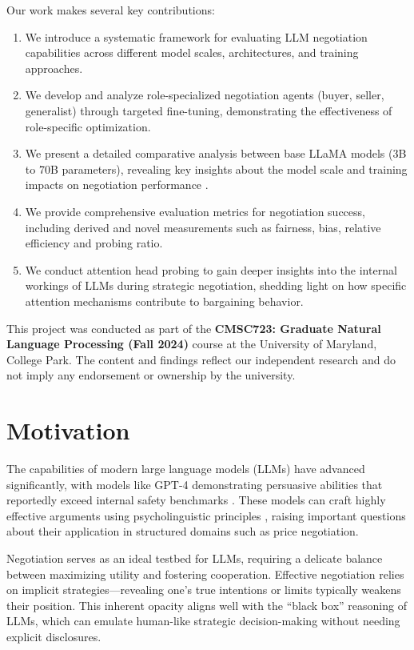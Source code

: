 \documentclass[11pt]{article}
\begin{document}
Our work makes several key contributions:
\begin{enumerate}
    \item We introduce a systematic framework for evaluating LLM negotiation capabilities across different model scales, architectures, and training approaches.
    \item We develop and analyze role-specialized negotiation agents (buyer, seller, generalist) through targeted fine-tuning, demonstrating the effectiveness of role-specific optimization.
    \item We present a detailed comparative analysis between base LLaMA models (3B to 70B parameters), revealing key insights about the model scale and training impacts on negotiation performance \citep{touvron2023llamaopenefficientfoundation}.
    \item We provide comprehensive evaluation metrics for negotiation success, including derived and novel measurements such as fairness, bias, relative efficiency and probing ratio.
    \item We conduct attention head probing to gain deeper insights into the internal workings of LLMs during strategic negotiation, shedding light on how specific attention mechanisms contribute to bargaining behavior.
\end{enumerate}

This project was conducted as part of the \textbf{CMSC723: Graduate Natural Language Processing (Fall 2024)} course at the University of Maryland, College Park. The content and findings reflect our independent research and do not imply any endorsement or ownership by the university.


\section{Motivation}

The capabilities of modern large language models (LLMs) have advanced significantly, with models like GPT-4 demonstrating persuasive abilities that reportedly exceed internal safety benchmarks \citep{seetharaman2024turning}. These models can craft highly effective arguments using psycholinguistic principles \citep{breum2023persuasivepowerlargelanguage}, raising important questions about their application in structured domains such as price negotiation.

Negotiation serves as an ideal testbed for LLMs, requiring a delicate balance between maximizing utility and fostering cooperation. Effective negotiation relies on implicit strategies—revealing one’s true intentions or limits typically weakens their position. This inherent opacity aligns well with the ``black box'' reasoning of LLMs, which can emulate human-like strategic decision-making without needing explicit disclosures.
\end{document}
